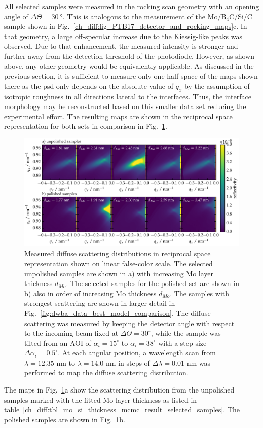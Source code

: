 All selected samples were measured in the rocking scan geometry with an opening angle of $\Delta \Theta = \SI{30}{\degree}$. This is analogous to the measurement of the Mo/B$_4$C/Si/C sample shown in Fig.~\ref{ch_diff:fig_PTB17_detector_and_rocking_maps}c. In that geometry, a large off-specular increase due to the Kiessig-like peaks was observed. Due to that enhancement, the measured intensity is stronger and further away from the detection threshold of the photodiode. However, as shown above, any other geometry would be equivalently applicable. As discussed in the previous section, it is sufficient to measure only one half space of the maps shown there as the \gls{psd} only depends on the absolute value of $q_x$ by the assumption of isotropic roughness in all directions lateral to the interfaces. Thus, the interface morphology may be reconstructed based on this smaller data set reducing the experimental effort. The resulting maps are shown in the reciprocal space representation for both sets in comparison in Fig.~\ref{ch_diff:fig_mo_si_c_diffuse}.
\begin{figure}[htbp]
\centering
\includegraphics[width=\textwidth]{img/MoSiC_diffuse_measurements}
\caption{Measured diffuse scattering distributions in reciprocal space representation shown on linear false-color scale. The selected unpolished samples are shown in a) with increasing Mo layer thickness $d_{Mo}$. The selected samples for the polished set are shown in b) also in order of increasing Mo thickness $d_{Mo}$. The samples with strongest scattering are shown in larger detail in Fig.~\ref{fig:dwba_data_best_model_comparison}. The diffuse scattering was measured by keeping the detector angle with respect to the incoming beam fixed at $\Delta\Theta = 30^\circ$, while the sample was tilted from an AOI of $\alpha_i=15^\circ$ to $\alpha_i=38^\circ$ with a step size $\Delta\alpha_i = 0.5^\circ$. At each angular position, a wavelength scan from $\lambda=12.35$ nm to $\lambda=14.0$ nm in steps of $\Delta\lambda = 0.01$ nm was performed to map the diffuse scattering distribution.}
\label{ch_diff:fig_mo_si_c_diffuse}
\end{figure}
The maps in Fig.~\ref{ch_diff:fig_mo_si_c_diffuse}a show the scattering distribution from the unpolished samples marked with the fitted Mo layer thickness as listed in table~\ref{ch_diff:tbl_mo_si_thickness_mcmc_result_selected_samples}. The polished samples are shown in Fig.~\ref{ch_diff:fig_mo_si_c_diffuse}b.

